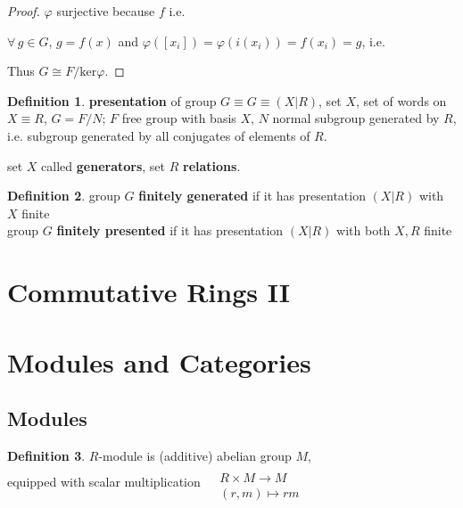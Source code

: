 \documentclass[twoside,landscape]{amsart}
\theoremstyle{plain}
\theoremstyle{definition}
\newtheorem{definition}{Definition}
\theoremstyle{remark}
\begin{document}
\begin{multicols*}{2}
\begin{proof}
$\varphi$ surjective because $f$ i.e. 

$\forall \, g \in G$, $g=f(x)$ and $\varphi([x_i]) = \varphi(i(x_i)) = f(x_i)=g$, i.e.

Thus $G \cong F/\text{ker}\varphi$.  

\end{proof}


\begin{definition}
  \textbf{presentation} of group $G \equiv G \equiv (X|R)$, set $X$, set of words on $X \equiv R$, $G=F/N$; $F$ free group with basis $X$, $N$ normal subgroup generated by $R$, i.e. subgroup generated by all conjugates of elements of $R$.  

set $X$ called \textbf{generators}, set $R$ \textbf{relations}.   
\end{definition}


\begin{definition}
  group $G$ \textbf{finitely generated} if it has presentation $(X|R)$ with $X$ finite \\
  group $G$ \textbf{finitely presented} if it has presentation $(X|R)$ with both $X,R$ finite
\end{definition}



\section{ Commutative Rings II }



\section{Modules and Categories }

\subsection{Modules}

\begin{definition}
  $R$-module is (additive) abelian group $M$, \\
equipped with scalar multiplication $\begin{aligned} & \quad \\
  & R \times M \to M \\
  & (r,m) \mapsto rm \end{aligned}$ 


\end{definition}
\end{multicols*}
\end{document}
